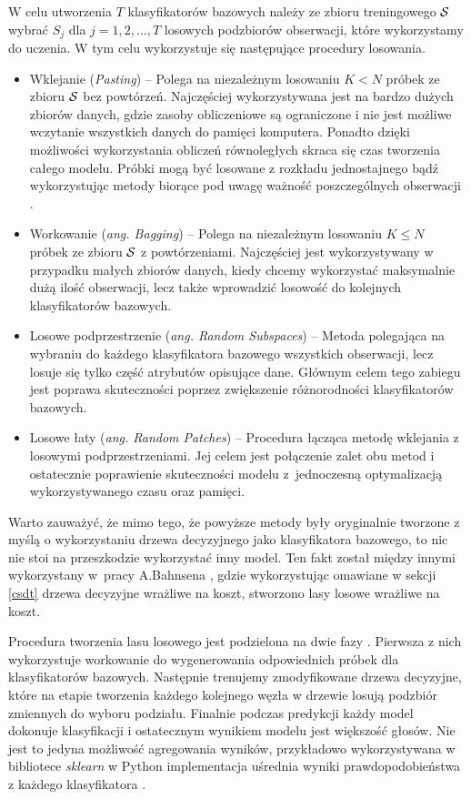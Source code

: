 \documentclass[inzynierska]{pwr_wmat_praca_dyplomowa}
\theoremstyle{plain}
\numberwithin{theorem}{chapter}
\theoremstyle{definition}
\numberwithin{theorem}{chapter}
\begin{document}
W celu utworzenia $T$ klasyfikatorów bazowych należy ze zbioru treningowego $\mathcal{S}$ wybrać $S_j$ dla $j=1,2,\dots,T$ losowych podzbiorów obserwacji, które wykorzystamy do uczenia. W tym celu wykorzystuje się następujące procedury losowania.

\begin{itemize}
	\item Wklejanie (\textit{Pasting}) -- Polega na niezależnym losowaniu $K < N$ próbek ze zbioru $\mathcal{S}$ bez powtórzeń. Najczęściej wykorzystywana jest na bardzo dużych zbiorów danych, gdzie zasoby obliczeniowe są ograniczone i nie jest możliwe wczytanie wszystkich danych do pamięci komputera. Ponadto dzięki możliwości wykorzystania obliczeń równoległych skraca się czas tworzenia całego modelu. Próbki mogą być losowane z rozkładu jednostajnego bądź wykorzystując metody biorące pod uwagę ważność poszczególnych obserwacji \cite{Pasting}.
	\item Workowanie (\textit{ang. Bagging}) -- Polega na niezależnym losowaniu $K \leq N$ próbek ze zbioru $\mathcal{S}$ z powtórzeniami. Najczęściej jest wykorzystywany w przypadku małych zbiorów danych, kiedy chcemy wykorzystać maksymalnie dużą ilość obserwacji, lecz także wprowadzić losowość do kolejnych klasyfikatorów bazowych.
	\item Losowe podprzestrzenie (\textit{ang. Random Subspaces}) -- Metoda polegająca na wybraniu do każdego klasyfikatora bazowego wszystkich obserwacji, lecz losuje się tylko część atrybutów opisujące dane. Głównym celem tego zabiegu jest poprawa skuteczności poprzez zwiększenie różnorodności klasyfikatorów bazowych. \cite{Random_Subspace}
	\item Losowe łaty (\textit{ang. Random Patches}) -- Procedura łącząca metodę wklejania z losowymi podprzestrzeniami. Jej celem jest połączenie zalet obu metod i ostatecznie poprawienie skuteczności modelu z~jednoczesną optymalizacją wykorzystywanego czasu oraz pamięci. \cite{Random_Patches}
\end{itemize}
Warto zauważyć, że mimo tego, że powyższe metody były oryginalnie tworzone z myślą o wykorzystaniu drzewa decyzyjnego jako klasyfikatora bazowego, to nic nie stoi na przeszkodzie wykorzystać inny model. Ten fakt został między innymi wykorzystany w~pracy A.Bahnsena \cite{alej2015ensemble}, gdzie wykorzystując omawiane w sekcji \ref{csdt} drzewa decyzyjne wrażliwe na koszt, stworzono lasy losowe wrażliwe na koszt.

Procedura tworzenia lasu losowego jest podzielona na dwie fazy \cite{Random_Forest}. Pierwsza z nich wykorzystuje workowanie do wygenerowania odpowiednich próbek dla klasyfikatorów bazowych. Następnie trenujemy zmodyfikowane drzewa decyzyjne, które na etapie tworzenia każdego kolejnego węzła w drzewie losują podzbiór zmiennych do wyboru podziału. Finalnie podczas predykcji każdy model dokonuje klasyfikacji i ostatecznym wynikiem modelu jest większość głosów. Nie jest to jedyna możliwość agregowania wyników, przykładowo wykorzystywana w bibliotece \textit{sklearn} w Python implementacja uśrednia wyniki prawdopodobieństwa z każdego klasyfikatora \cite{sklearn_api}.
\end{document}
